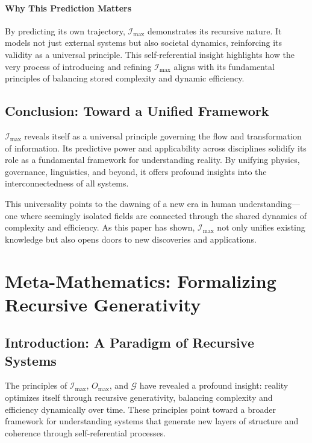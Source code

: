 \documentclass[12pt]{article}
\begin{document}
\paragraph{Why This Prediction Matters}
By predicting its own trajectory, \(\mathcal{I}_{\text{max}}\) demonstrates its recursive nature. It models not just external systems but also societal dynamics, reinforcing its validity as a universal principle. This self-referential insight highlights how the very process of introducing and refining \( \mathcal{I}_{\text{max}} \) aligns with its fundamental principles of balancing stored complexity and dynamic efficiency.

\subsection{Conclusion: Toward a Unified Framework}
\(\mathcal{I}_{\text{max}}\) reveals itself as a universal principle governing the flow and transformation of information. Its predictive power and applicability across disciplines solidify its role as a fundamental framework for understanding reality. By unifying physics, governance, linguistics, and beyond, it offers profound insights into the interconnectedness of all systems.

This universality points to the dawning of a new era in human understanding—one where seemingly isolated fields are connected through the shared dynamics of complexity and efficiency. As this paper has shown, \(\mathcal{I}_{\text{max}}\) not only unifies existing knowledge but also opens doors to new discoveries and applications.


\section{Meta-Mathematics: Formalizing Recursive Generativity}

\subsection{Introduction: A Paradigm of Recursive Systems}

The principles of \(\mathcal{I}_{\text{max}}\), \(O_{\text{max}}\), and \(\mathcal{G}\) have revealed a profound insight: reality optimizes itself through recursive generativity, balancing complexity and efficiency dynamically over time. These principles point toward a broader framework for understanding systems that generate new layers of structure and coherence through self-referential processes.
\end{document}
